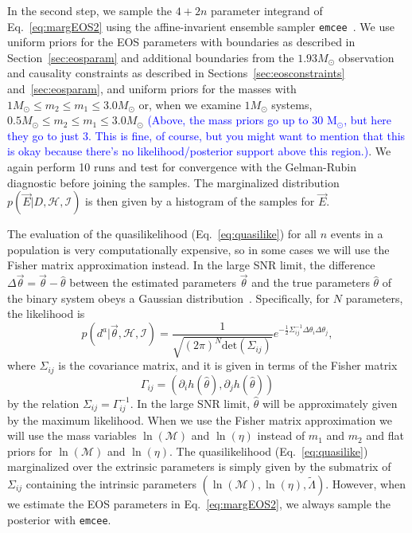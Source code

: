 \documentclass[twocolumn,prd,amssymb,aps,nofootinbib,showpacs,epsf]{revtex4}
\newcommand\les[2]{\textcolor{blue}{{#1}\sout{#2}}}
\begin{document}
In the second step, we sample the $4+2n$ parameter integrand of Eq.~\eqref{eq:margEOS2} using the affine-invarient ensemble sampler \texttt{emcee}~\cite{ForemanMackeyHogg2013}. We use uniform priors for the EOS parameters with boundaries as described in Section~\ref{sec:eosparam} and additional boundaries from the $1.93M_\odot$ observation and causality constraints as described in Sections~\ref{sec:eosconstraints} and~\ref{sec:eosparam}, and uniform priors for the masses with $1M_\odot \le m_2 \le m_1 \le 3.0M_\odot$ or, when we examine $1M_\odot$ systems, $0.5M_\odot \le m_2 \le m_1 \le 3.0M_\odot$ \les{(Above, the mass priors go up to 30 M$_\odot$, but here they go to just 3.  This is fine, of course, but you might want to mention that this is okay because there's no likelihood/posterior support above this region.)}{}. We again perform 10 runs and test for convergence with the Gelman-Rubin diagnostic before joining the samples. The marginalized distribution $p(\vec E|D, \mathcal{H}, \mathcal{I})$ is then given by a histogram of the samples for $\vec E$.

The evaluation of the quasilikelihood (Eq.~\eqref{eq:quasilike}) for all $n$ events in a population is very computationally expensive, so in some cases we will use the Fisher matrix approximation instead. In the large SNR limit, the difference $\Delta\vec\theta = \vec\theta - \hat\theta$ between the estimated parameters $\vec\theta$ and the true parameters $\hat\theta$ of the binary system obeys a Gaussian distribution~\cite{FinnChernoff1993}. Specifically, for $N$ parameters, the likelihood is
\begin{equation}
\label{eq:gaussianlike}
p(d^a | \vec\theta,\mathcal{H},\mathcal{I}) = \frac{1}{\sqrt{(2\pi)^N \mathrm{det}(\Sigma_{ij})}} e^{-\frac{1}{2} \Sigma^{-1}_{ij} \Delta\theta_i \Delta\theta_j},
\end{equation}
where $\Sigma_{ij}$ is the covariance matrix, and it is given in terms of the Fisher matrix
\begin{equation}
\Gamma_{ij} = (\partial_i h(\hat\theta), \partial_j h(\hat\theta))
\end{equation}
by the relation $\Sigma_{ij}  = \Gamma^{-1}_{ij}$. In the large SNR limit, $\hat\theta$ will be approximately given by the maximum likelihood. When we use the Fisher matrix approximation we will use the mass variables $\ln(\mathcal{M})$ and $\ln(\eta)$ instead of $m_1$ and $m_2$ and flat priors for $\ln(\mathcal{M})$ and $\ln(\eta)$. The quasilikelihood (Eq.~\eqref{eq:quasilike}) marginalized over the extrinsic parameters is simply given by the submatrix of $\Sigma_{ij}$ containing the intrinsic parameters $(\ln(\mathcal{M}), \ln(\eta), \tilde\Lambda)$. However, when we estimate the EOS parameters in Eq.~\eqref{eq:margEOS2}, we always sample the posterior with \texttt{emcee}.
\end{document}
